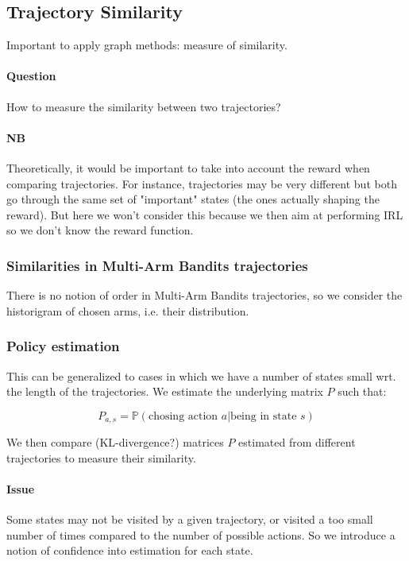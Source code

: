 \documentclass{article}
\begin{document}
\subsection{Trajectory Similarity}

Important to apply graph methods: measure of similarity.

\paragraph{Question}
How to measure the similarity between two trajectories?

\paragraph{NB} Theoretically, it would be important to take into account the reward when comparing trajectories. For instance, trajectories may be very different but both go through the same set of "important" states (the ones actually shaping the reward). But here we won't consider this because we then aim at performing IRL so we don't know the reward function.

\subsubsection{Similarities in Multi-Arm Bandits trajectories}

There is no notion of order in Multi-Arm Bandits trajectories, so we consider the historigram of chosen arms, i.e. their distribution.

\subsubsection{Policy estimation}

This can be generalized to cases in which we have a number of states small wrt. the length of the trajectories. We estimate the underlying matrix $P$ such that:

\[
P_{a,s} = \mathbb P(\text{chosing action } a | \text{being in state } s)
\]

We then compare (KL-divergence?) matrices $P$ estimated from different trajectories to measure their similarity.

\paragraph{Issue} Some states may not be visited by a given trajectory, or visited a too small number of times compared to the number of possible actions. So we introduce a notion of confidence into estimation for each state.
\end{document}
